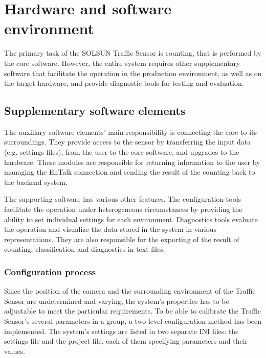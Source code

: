 \chapter{Hardware and software environment}\label{chap:Environment}
The primary task of the SOLSUN Traffic Sensor is counting, that is performed by the core software.
However, the entire system requires other supplementary software that facilitate the operation in the production environment, as well as on the target hardware, and provide diagnostic tools for testing and evaluation.
\section{Supplementary software elements}\label{sec:SupplementarySoftware}
The auxiliary software elements' main responsibility is connecting the core to its surroundings.
They provide access to the sensor by transferring the input data (e.g. settings files), from the user to the core software, and upgrades to the hardware.
These modules are responsible for returning information to the user by managing the EnTalk connection and sending the result of the counting back to the backend system.

The supporting software has various other features.
The configuration tools facilitate the operation under heterogeneous circumstances by providing the ability to set individual settings for each environment.
Diagnostics tools evaluate the operation and visualize the data stored in the system in various representations.
They are also responsible for the exporting of the result of counting, classification and diagnostics in text files.
\subsection{Configuration process}\label{subs:ProjectConfigurator}
Since the position of the camera and the surrounding environment of the Traffic Sensor are undetermined and varying, the system's properties has to be adjustable to meet the particular requirements.
To be able to calibrate the Traffic Sensor's several parameters in a group, a two-level configuration method has been implemented.
The system's settings are listed in two separate INI files: the settings file and the project file, each of them specifying parameters and their values.


